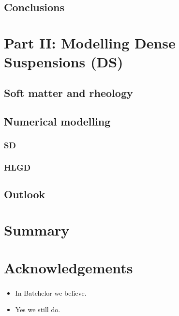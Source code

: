 \hypertarget{conclusion1}{%
  \subsection{Conclusions}}


\hypertarget{part2}{%
  \section{Part II: Modelling Dense Suspensions (DS)}}

\hypertarget{background2}{%
  \subsection{Soft matter and rheology}}

\hypertarget{simulation2}{%
  \subsection{Numerical modelling}}

\hypertarget{sd}{%
  \subsubsection{SD}}

\hypertarget{hlgd}{%
  \subsubsection{HLGD}}

\hypertarget{conclusion2}{%
  \subsection{Outlook}}

\hypertarget{summary}{%
  \section{Summary}}

\hypertarget{acknowledgements}{%
  \section{Acknowledgements}}










\iffalse

\begin{frame}
  \frametitle{}

  \begin{bluecolorbox}  
  \begin{itemize}
  \item
    In Batchelor we believe.
  \item
    Yes we still do.
  \end{itemize}  
  \end{bluecolorbox}  

\end{frame}

